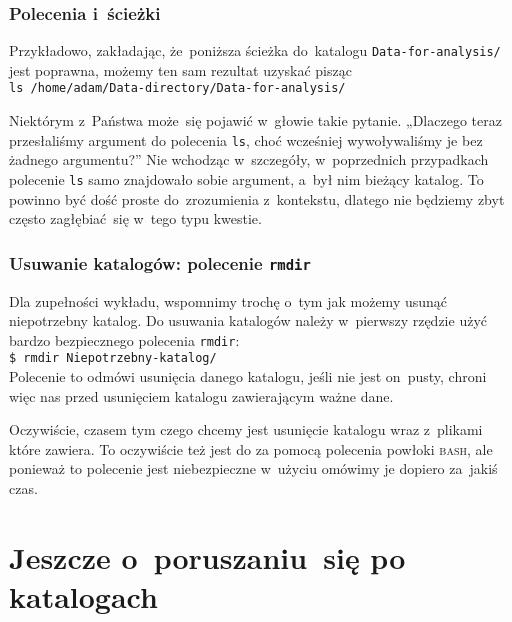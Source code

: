 \documentclass[10pt,t]{beamer}
\begin{document}
\begin{frame}
  \frametitle{Polecenia i~ścieżki}


  Przykładowo, zakładając, że~poniższa ścieżka do~katalogu
  \texttt{Data-for-analysis/} jest poprawna, możemy ten sam rezultat uzyskać
  pisząc \\
  \texttt{ls /home/adam/Data-directory/Data-for-analysis/}

  Niektórym z~Państwa może~się pojawić w~głowie takie pytanie. „Dlaczego
  teraz przesłaliśmy argument do polecenia \texttt{ls}, choć wcześniej
  wywoływaliśmy je bez żadnego argumentu?” Nie wchodząc w~szczegóły,
  w~poprzednich przypadkach polecenie \texttt{ls} samo znajdowało sobie
  argument, a~był nim bieżący katalog. To powinno być dość proste
  do~zrozumienia z~kontekstu, dlatego nie będziemy zbyt często
  zagłębiać~się w~tego typu kwestie.

\end{frame}





\begin{frame}
  \frametitle{Usuwanie katalogów: polecenie \texttt{rmdir}}


  Dla zupełności wykładu, wspomnimy trochę o~tym jak możemy usunąć
  niepotrzebny katalog. Do usuwania katalogów należy w~pierwszy rzędzie
  użyć bardzo bezpiecznego polecenia \texttt{rmdir}: \\
  \texttt{\$ rmdir Niepotrzebny-katalog/} \\
  Polecenie to odmówi usunięcia danego katalogu, jeśli nie jest on~pusty,
  chroni więc nas przed usunięciem katalogu zawierającym ważne dane.

  Oczywiście, czasem tym czego chcemy jest usunięcie katalogu wraz
  z~plikami które \alert{zawiera}. To oczywiście też jest do za pomocą
  polecenia powłoki \textsc{bash}, ale ponieważ to polecenie jest
  niebezpieczne w~użyciu omówimy je dopiero za~jakiś czas.

\end{frame}










\section{Jeszcze o~poruszaniu~się po katalogach}
\end{document}
